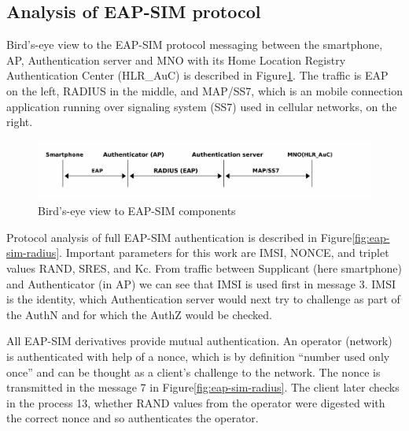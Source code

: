 \documentclass[12pt,a4paper,english]{tutthesis}
\begin{document}
\begin{otherlanguage}{english}
\section{Analysis of EAP-SIM protocol}
\label{sec-2-6}
Bird's-eye view to the EAP-SIM protocol messaging between the
smartphone, AP, Authentication server and MNO with its Home Location
Registry Authentication Center (HLR\_AuC) is described in
Figure\ref{fig:eap-sim-bird}.  The traffic is EAP on the left, RADIUS in the
middle, and MAP/SS7, which is an mobile connection application running
over signaling system (SS7) used in cellular networks, on the right.


\begin{figure}[htb]
\centering
\includegraphics[width=.9\linewidth]{eap-sim-bird.png}
\caption{\label{fig:eap-sim-bird}Bird's-eye view to EAP-SIM components}
\end{figure}





Protocol analysis of full EAP-SIM authentication is described 
in Figure\ref{fig:eap-sim-radius}.
Important parameters for this work are IMSI, NONCE, and triplet values
RAND, SRES, and Kc. 
From traffic between Supplicant (here smartphone) and Authenticator (in AP)
we can see that IMSI is used first in message 3. IMSI is the
identity, which Authentication server would next try to challenge as
part of the AuthN and for which the AuthZ would be checked.







All EAP-SIM derivatives provide mutual authentication.
An operator (network) is authenticated with help of a nonce,
which is by definition ``number used only once'' and can
be thought as a client's challenge to the network.
The nonce is transmitted in the message 7 in Figure\ref{fig:eap-sim-radius}.
The client later checks in the process 13, whether RAND values from
the operator were digested with the correct nonce and so authenticates
the operator.


\end{otherlanguage}
\end{document}
